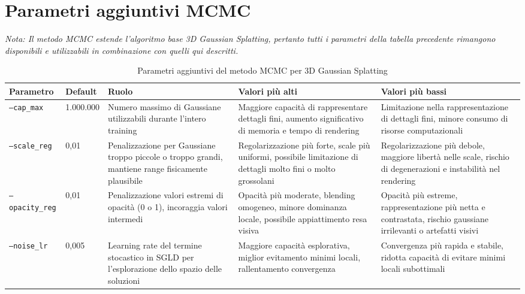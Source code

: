 \section{Parametri aggiuntivi MCMC}\label{app:mcmc}  
\begin{sidewaystable}
	\centering
	\footnotesize
	\textit{Nota: Il metodo MCMC estende l'algoritmo base 3D Gaussian Splatting, pertanto tutti i parametri della tabella precedente rimangono disponibili e utilizzabili in combinazione con quelli qui descritti.}
	\vspace{0.3cm}
	\begin{tabular}{|p{3.5cm}|p{1.5cm}|p{4cm}|p{4cm}|p{3.5cm}|}
		\hline
		\textbf{Parametro} & \textbf{Default} & \textbf{Ruolo} & \textbf{Valori più alti} & \textbf{Valori più bassi} \\ 
		\hline
		\texttt{--cap\_max} & 1.000.000 & Numero massimo di Gaussiane utilizzabili durante l'intero training & Maggiore capacità di rappresentare dettagli fini, aumento significativo di memoria e tempo di rendering & Limitazione nella rappresentazione di dettagli fini, minore consumo di risorse computazionali \\
		\hline
		\texttt{--scale\_reg} & 0,01 & Penalizzazione per Gaussiane troppo piccole o troppo grandi, mantiene range fisicamente plausibile & Regolarizzazione più forte, scale più uniformi, possibile limitazione di dettagli molto fini o molto grossolani & Regolarizzazione più debole, maggiore libertà nelle scale, rischio di degenerazioni e instabilità nel rendering \\
		\hline
		\texttt{--opacity\_reg} & 0,01 & Penalizzazione valori estremi di opacità (0 o 1), incoraggia valori intermedi & Opacità più moderate, blending omogeneo, minore dominanza locale, possibile appiattimento resa visiva & Opacità più estreme, rappresentazione più netta e contrastata, rischio gaussiane irrilevanti o artefatti visivi \\
		\hline
		\texttt{--noise\_lr} & 0,005 & Learning rate del termine stocastico in SGLD per l'esplorazione dello spazio delle soluzioni & Maggiore capacità esplorativa, miglior evitamento minimi locali, rallentamento convergenza & Convergenza più rapida e stabile, ridotta capacità di evitare minimi locali subottimali \\
		\hline
	\end{tabular}
	\caption{Parametri aggiuntivi del metodo MCMC per 3D Gaussian Splatting}
	\label{tab:mcmc_params}
\end{sidewaystable}

